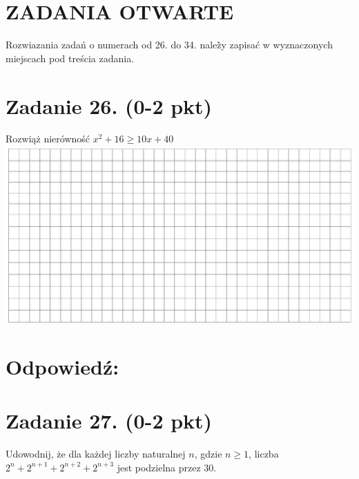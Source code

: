 \documentclass[10pt]{article}
\begin{document}
\section*{ZADANIA OTWARTE}
Rozwiazania zadań o numerach od 26. do 34. należ̀y zapisać w wyznaczonych miejscach pod treścia zadania.

\section*{Zadanie 26. (0-2 pkt)}
Rozwiąż nierówność \(x^{2}+16 \geq 10 x+40\)\\
\includegraphics[max width=\textwidth, center]{2024_11_21_997c30e0b98e62837d84g-12}

\section*{Odpowiedź:}
\section*{Zadanie 27. (0-2 pkt)}
Udowodnij, że dla każdej liczby naturalnej \(n\), gdzie \(n \geq 1\), liczba \(2^{n}+2^{n+1}+2^{n+2}+2^{n+3}\) jest podzielna przez 30.
\end{document}
